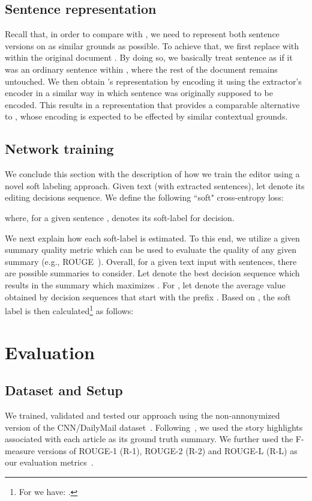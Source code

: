 \documentclass{article}
\begin{document}
\subsection{Sentence representation}
Recall that, in order to compare  with , we need to represent both sentence versions on as similar grounds as possible.
To achieve that, we first replace  with  within the original document . By doing so, we basically treat sentence  as if it was an ordinary sentence within , where the rest of the document remains untouched. We then obtain 's representation by encoding it using the extractor's encoder in a similar way in which sentence  was originally supposed to be encoded.
This results in a representation  that provides a comparable alternative to , whose encoding is expected to be effected by similar contextual grounds.


\subsection{Network training}\label{sec:network_train}
We conclude this section with the description of how we train the editor using a novel soft labeling approach.
Given text  (with  extracted sentences), let  denote its editing decisions sequence. We define the following ``soft" cross-entropy loss:


where, for a given sentence ,  denotes its soft-label for decision.  

We next explain how each soft-label  is estimated. 
To this end, we utilize a given summary quality metric  which can be used to evaluate the quality of any given summary  
(e.g., ROUGE~\cite{lin2004rouge}). Overall, for a given text input  with  sentences, there are  possible summaries  to consider. Let  denote the best decision sequence which results in the summary which maximizes . For , let  denote the average  value obtained by decision sequences that start with the prefix . Based on , the soft label  is then calculated\footnote{\small For  we have: .} as follows:




\section{Evaluation}
\subsection{Dataset and Setup}
We trained, validated and tested our approach using the non-annonymized version of the CNN/DailyMail dataset~\cite{Hermann:2015:TMR:2969239.2969428}. Following~\cite{DBLP:conf/conll/NallapatiZSGX16}, we used the story highlights associated with each article as its ground truth summary. We further used the F-measure versions of ROUGE-1 (R-1), ROUGE-2 (R-2) and ROUGE-L (R-L) as our evaluation metrics~\cite{lin2004rouge}.
\end{document}
